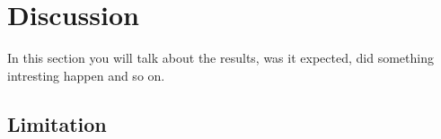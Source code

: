 \section{Discussion}
In this section you will talk about the results, was it expected, did something intresting happen and so on.

\subsection{Limitation}